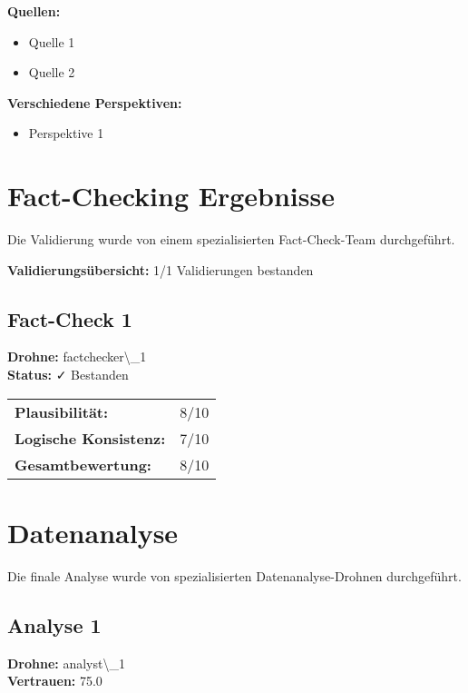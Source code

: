 \documentclass[12pt,a4paper]{article}
\begin{document}
\textbf{Quellen:}
\begin{itemize}
\item Quelle 1
\item Quelle 2
\end{itemize}

\textbf{Verschiedene Perspektiven:}
\begin{itemize}
\item Perspektive 1
\end{itemize}


\newpage
\section{Fact-Checking Ergebnisse}

Die Validierung wurde von einem spezialisierten Fact-Check-Team durchgeführt.

\begin{infobox}
\textbf{Validierungsübersicht:} 1/1 Validierungen bestanden
\end{infobox}

\subsection{Fact-Check 1}

\textbf{Drohne:} factchecker\textbackslash{}_1\\
\textbf{Status:} ✓ Bestanden\\

\begin{tabular}{ll}
\textbf{Plausibilität:} & 8/10 \\
\textbf{Logische Konsistenz:} & 7/10 \\
\textbf{Gesamtbewertung:} & 8/10 \\
\end{tabular}


\newpage
\section{Datenanalyse}

Die finale Analyse wurde von spezialisierten Datenanalyse-Drohnen durchgeführt.

\subsection{Analyse 1}

\textbf{Drohne:} analyst\textbackslash{}_1\\
\textbf{Vertrauen:} 75.0%
\end{document}
